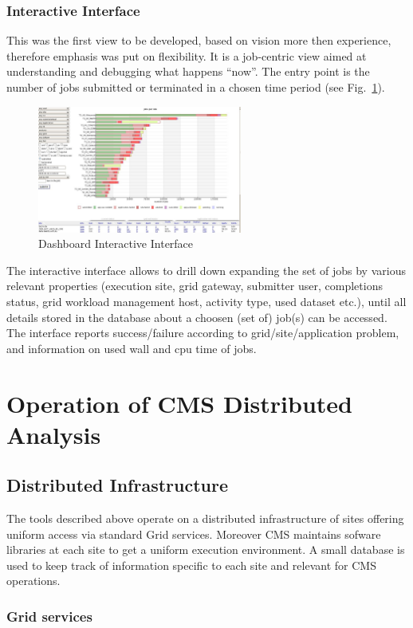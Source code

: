 \subsubsection{Interactive Interface}
This was the first view to be developed, based on
vision more then experience, therefore
emphasis was put on flexibility. It is a job-centric view
aimed at understanding and debugging what happens ``now''.
The entry point is the number of jobs submitted or
terminated in a chosen time period (see Fig.~\ref{fig:Dashboard}).
\begin{figure}
 \includegraphics[width=0.60\textwidth]{DashboardInteractive.eps}
\caption{Dashboard Interactive Interface}
\label{fig:Dashboard}
\end{figure}
The interactive interface allows to drill down expanding the set of jobs by
various relevant properties (execution site, grid gateway,
submitter user, completions status, grid workload management host,
activity type, used dataset etc.), until all details stored in the database
about a choosen (set of) job(s) can be accessed.
The interface reports success/failure
according to grid/site/application problem, and information
on used wall and cpu time of jobs.

\section{Operation of CMS Distributed Analysis}
\label{sec:4}
\subsection{Distributed Infrastructure}
\label{sec:4_1}
The tools described above operate on a distributed infrastructure
of sites offering uniform access via standard Grid services. Moreover CMS maintains sofware libraries at each site to get a uniform execution
environment. A small database is used to keep track of
information specific to each site and relevant for CMS operations.

\subsubsection{ Grid services }
\label{sec:4_1_1}

